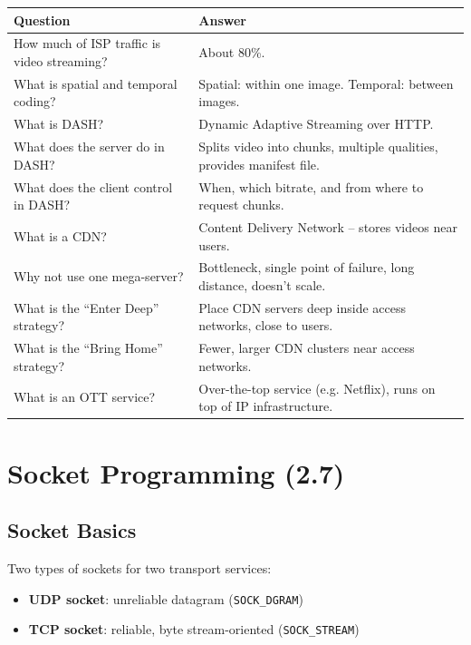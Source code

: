 \begin{exambox}
\small
\begin{longtable}{p{7cm}p{7cm}}
\toprule
\textbf{Question} & \textbf{Answer} \\
\midrule
\endhead
How much of ISP traffic is video streaming? & About 80\%. \\
\midrule
What is spatial and temporal coding? & Spatial: within one image. Temporal: between images. \\
\midrule
What is DASH? & Dynamic Adaptive Streaming over HTTP. \\
\midrule
What does the server do in DASH? & Splits video into chunks, multiple qualities, provides manifest file. \\
\midrule
What does the client control in DASH? & When, which bitrate, and from where to request chunks. \\
\midrule
What is a CDN? & Content Delivery Network -- stores videos near users. \\
\midrule
Why not use one mega-server? & Bottleneck, single point of failure, long distance, doesn't scale. \\
\midrule
What is the ``Enter Deep'' strategy? & Place CDN servers deep inside access networks, close to users. \\
\midrule
What is the ``Bring Home'' strategy? & Fewer, larger CDN clusters near access networks. \\
\midrule
What is an OTT service? & Over-the-top service (e.g. Netflix), runs on top of IP infrastructure. \\
\bottomrule
\end{longtable}
\end{exambox}


\newpage
\section{Socket Programming (2.7)}

\subsection{Socket Basics}

\begin{keybox}[Socket = The ``Door'' between Application and Transport]
Two types of sockets for two transport services:
\begin{itemize}[noitemsep]
    \item \textbf{UDP socket}: unreliable datagram (\texttt{SOCK\_DGRAM})
    \item \textbf{TCP socket}: reliable, byte stream-oriented (\texttt{SOCK\_STREAM})
\end{itemize}
\end{keybox}

